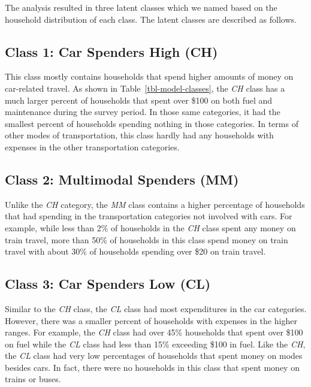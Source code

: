 \documentclass[
]{agujournal2019}
\begin{document}
The analysis resulted in three latent classes which we named based on
the household distribution of each class. The latent classes are
described as follows.

\subsection{Class 1: Car Spenders High
(CH)}\label{class-1-car-spenders-high-ch}

This class mostly contains households that spend higher amounts of money
on car-related travel. As shown in Table~\ref{tbl-model-classes}, the
\emph{CH} class has a much larger percent of households that spent over
\$100 on both fuel and maintenance during the survey period. In those
same categories, it had the smallest percent of households spending
nothing in those categories. In terms of other modes of transportation,
this class hardly had any households with expenses in the other
transportation categories.

\subsection{Class 2: Multimodal Spenders
(MM)}\label{class-2-multimodal-spenders-mm}

Unlike the \emph{CH} category, the \emph{MM} class contains a higher
percentage of households that had spending in the transportation
categories not involved with cars. For example, while less than 2\% of
households in the \emph{CH} class spent any money on train travel, more
than 50\% of households in this class spend money on train travel with
about 30\% of households spending over \$20 on train travel.

\subsection{Class 3: Car Spenders Low
(CL)}\label{class-3-car-spenders-low-cl}

Similar to the \emph{CH} class, the \emph{CL} class had most
expenditures in the car categories. However, there was a smaller percent
of households with expenses in the higher ranges. For example, the
\emph{CH} class had over 45\% households that spent over \$100 on fuel
while the \emph{CL} class had less than 15\% exceeding \$100 in fuel.
Like the \emph{CH}, the \emph{CL} class had very low percentages of
households that spent money on modes besides cars. In fact, there were
no households in this class that spent money on trains or buses.
\end{document}

